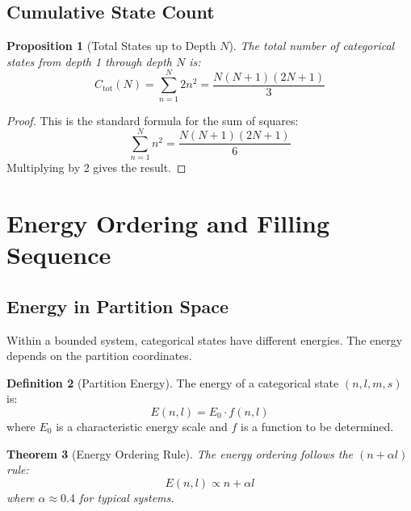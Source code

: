 \documentclass[twocolumn,10pt,a4paper]{article}
\newtheorem{theorem}{Theorem}[section]
\newtheorem{proposition}[theorem]{Proposition}
\theoremstyle{definition}
\newtheorem{definition}[theorem]{Definition}
\theoremstyle{remark}
\begin{document}
\subsection{Cumulative State Count}

\begin{proposition}[Total States up to Depth $N$]
The total number of categorical states from depth 1 through depth $N$ is:
\begin{equation}
    C_{\text{tot}}(N) = \sum_{n=1}^{N} 2n^2 = \frac{N(N+1)(2N+1)}{3}
\end{equation}
\end{proposition}

\begin{proof}
This is the standard formula for the sum of squares:
\begin{equation}
    \sum_{n=1}^{N} n^2 = \frac{N(N+1)(2N+1)}{6}
\end{equation}
Multiplying by 2 gives the result.
\end{proof}

\section{Energy Ordering and Filling Sequence}
\label{sec:energy}

\subsection{Energy in Partition Space}

Within a bounded system, categorical states have different energies. The energy depends on the partition coordinates.

\begin{definition}[Partition Energy]
The energy of a categorical state $(n, l, m, s)$ is:
\begin{equation}
    E(n, l) = E_0 \cdot f(n, l)
\end{equation}
where $E_0$ is a characteristic energy scale and $f$ is a function to be determined.
\end{definition}

\begin{theorem}[Energy Ordering Rule]
\label{thm:energy_ordering}
The energy ordering follows the $(n + \alpha l)$ rule:
\begin{equation}
    E(n, l) \propto n + \alpha l
\end{equation}
where $\alpha \approx 0.4$ for typical systems.
\end{theorem}
\end{document}
